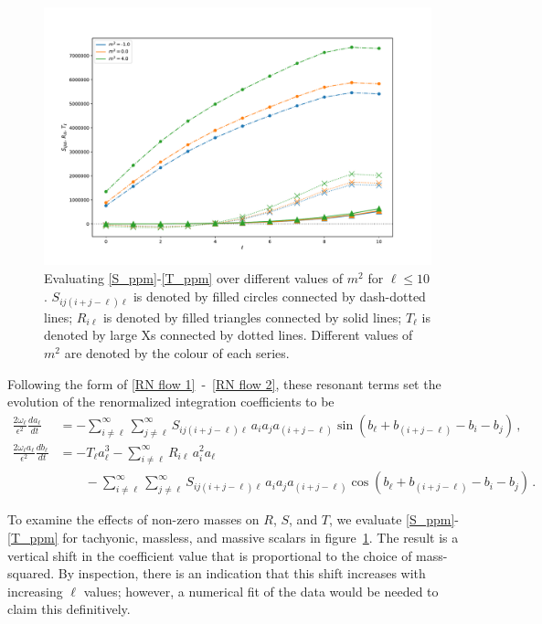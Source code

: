 \documentclass[letterpaper,11pt]{article}
\newcommand{\ol}{\omega_\ell}
\begin{document}
\begin{figure}
	\centering
		\includegraphics[width=\textwidth]{./figures/Nmodesplot}
		\caption{Evaluating \eqref{S_ppm}-\eqref{T_ppm} over different values of $m^2$ for $\ell \leq 10$. $S_{ij(i+j-\ell)\ell}$ is denoted by filled circles connected by dash-dotted lines; $R_{i\ell}$ is denoted by filled triangles connected by solid lines; $T_{\ell}$ is denoted by large Xs connected by dotted lines. Different values of $m^2$ are denoted by the colour of each series.}
		\label{fig: Nmodes}
	\end{figure}

Following the form of \eqref{RN flow 1}~-~\eqref{RN flow 2}, these resonant terms set the evolution of the renormalized integration coefficients to be \cite{1412.3249}
\begin{align}
\frac{2 \ol}{\epsilon^2} \frac{d a_\ell}{d t} &= -  \sum_{i \neq \ell}^\infty \sum_{j \neq \ell}^\infty S_{i j (i + j - \ell) \ell} \, a_i a_j a_{(i + j - \ell)} \sin ( b_\ell + b_{(i+j-\ell)} - b_i - b_j ) \, , \\
\frac{2 \ol a_\ell}{\epsilon^2} \frac{d b_\ell}{d t} &= - T_\ell a_\ell^3 - \sum^\infty_{i \neq \ell} R_{i\ell} \, a_i^2 a_\ell \nonumber \\
%
& \qquad - \sum_{i \neq \ell}^\infty \sum_{j \neq \ell}^\infty S_{i j (i + j - \ell) \ell} \, a_i a_j a_{(i + j - \ell)} \cos( b_\ell + b_{(i+j-\ell)} - b_i - b_j ) \, .
\end{align}

To examine the effects of non-zero masses on $R$, $S$, and $T$, we evaluate \eqref{S_ppm}-\eqref{T_ppm} for tachyonic, massless, and massive scalars in figure~\ref{fig: Nmodes}. The result is a vertical shift in the coefficient value that is proportional to the choice of mass-squared. By inspection, there is an indication that this shift increases with increasing $\ell$ values; however, a numerical fit of the data would be needed to claim this definitively. 








\end{document}
